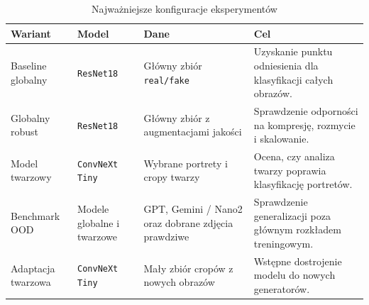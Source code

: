 \begin{table}[H]
\centering
\caption{Najważniejsze konfiguracje eksperymentów}
\label{tab:konfiguracje-eksperymentow}
\begin{tabular}{|L{3.3cm}|L{2.9cm}|L{2.9cm}|L{3.1cm}|}
\hline
\textbf{Wariant} & \textbf{Model} & \textbf{Dane} & \textbf{Cel} \\
\hline
Baseline globalny & \texttt{ResNet18} & Główny zbiór \texttt{real/fake} & Uzyskanie punktu odniesienia dla klasyfikacji całych obrazów. \\
\hline
Globalny robust & \texttt{ResNet18} & Główny zbiór z augmentacjami jakości & Sprawdzenie odporności na kompresję, rozmycie i skalowanie. \\
\hline
Model twarzowy & \texttt{ConvNeXt Tiny} & Wybrane portrety i cropy twarzy & Ocena, czy analiza twarzy poprawia klasyfikację portretów. \\
\hline
Benchmark OOD & Modele globalne i twarzowe & GPT, Gemini / Nano2 oraz dobrane zdjęcia prawdziwe & Sprawdzenie generalizacji poza głównym rozkładem treningowym. \\
\hline
Adaptacja twarzowa & \texttt{ConvNeXt Tiny} & Mały zbiór cropów z nowych obrazów & Wstępne dostrojenie modelu do nowych generatorów. \\
\hline
\end{tabular}
\end{table}
